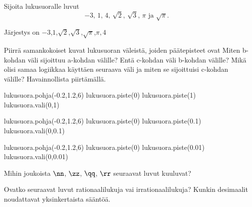 \begin{tehtavasivu}

\begin{tehtava}%
Sijoita lukusuoralle luvut
\[
\mbox{$-3$, $1$, $4$, $\sqrt{2}$, $\sqrt{3}$, $\pi$ ja $\sqrt{\pi}$.}
\]
	\begin{vastaus}
Järjestys on \mbox{$-3$,$1$,$\sqrt{2}$,$\sqrt{3}$,$\sqrt{\pi}$,$\pi,4$}
	\end{vastaus}
\end{tehtava}

\begin{tehtava} %
Piirrä samankokoiset kuvat lukusuoran väleistä, joiden päätepisteet ovat 
Miten b-kohdan väli sijoittuu a-kohdan välille? Entä c-kohdan väli b-kohdan välille? Mikä olisi samaa logiikkaa käyttäen seuraava väli ja miten se sijoittuisi c-kohdan välille? Havainnollista piirtämällä.
	\begin{vastaus}
\begin{kuva}
	lukusuora.pohja(-0.2,1.2,6)
	lukusuora.piste(0)
	lukusuora.piste(1)
	lukusuora.vali(0,1)
\end{kuva}
\begin{kuva}
	lukusuora.pohja(-0.2,1.2,6)
	lukusuora.piste(0)
	lukusuora.piste(0.1)
	lukusuora.vali(0,0.1)
\end{kuva}
\begin{kuva}
	lukusuora.pohja(-0.2,1.2,6)
	lukusuora.piste(0)
	lukusuora.piste(0.01)
	lukusuora.vali(0,0.01)
\end{kuva}
	\end{vastaus}
\end{tehtava}

\begin{tehtava}
Mihin joukoista $\nn$, $\zz$, $\qq$, $\rr$ seuraavat luvut kuuluvat?
	\begin{vastaus}
	\end{vastaus}
\end{tehtava}

\begin{tehtava}
Ovatko seuraavat luvut rationaalilukuja vai irrationaalilukuja? Kunkin desimaalit noudattavat yksinkertaista sääntöä.
\begin{vastaus}
\end{vastaus}
\end{tehtava}


\end{tehtavasivu}
